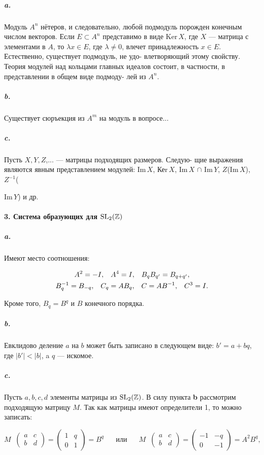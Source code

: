 \subparagraph{a.} Модуль $A^{n}$ нётеров, и следовательно, любой подмодуль порожден
конечным числом векторов. Если $E \subset A^{n}$ представимо в виде Ker\,{$X$},
где $X$ --- матрица с элементами в $A$, то $\lambda{x} \in E$, где $\lambda \neq 0$, влечет
принадлежность $x \in E$. Естественно, существует подмодуль, не удо-
влетворяющий этому свойству. Теория модулей над кольцами главных
идеалов состоит, в частности, в представлении в общем виде подмоду-
лей из $A^{n}$.

\subparagraph{b.} Существует сюръекция из $A^{m}$ на модуль в вопросе...

\subparagraph{c.} Пусть $X, Y, Z$,... --- матрицы подходящих размеров. Следую-
щие выражения являются явным представлением модулей: Im\,{$X$}, Кеr\,{$X$},
Im\,{$X$} $\cap$ Im\,{$Y$}, $Z$(Im\,{$X$}), $Z^{-1}$({Im\,{$Y$}) и др.

\paragraph{3. Система образующих для $\rm{SL_{2}}(\mathbb {Z})$}

\subparagraph{\bf a.} Имеют место соотношения:

\begin{gather*}
A^{2} = -I,\;\;\;A^{4} = I,\;\;\;B_{q}B_{q'} = B_{q+q'}, \\
B^{-1}_{q} = B_{-q},\;\;\;C_{q} = AB_{q},\;\;\;C = AB^{-1},\;\;\;C^{3} = I.  \notag
\end{gather*}

\noindent Кроме того, $B_{q} = B^{q}$ и $B$ конечного порядка.

\subparagraph{b.} Евклидово деление $a$ на $b$ может быть записано в следующем виде:
$b' = a + bq$, где $|b'| < |b|$, a $q$ --- искомое.


\restoretop
{}

\subparagraph{c.} Пусть $a, b, c, d$ элементы матрицы из $\rm{SL_{2}}(\mathbb {Z})$. В силу пункта {\bf b} рассмотрим подходящую матрицу $M$. Так как матрицы имеют определители 1, то можно записать:

\begin{equation*}
M\;\;{\begin{pmatrix} a & c \\ b & d \end{pmatrix}} = \begin{pmatrix} 1 & q \\ 0 & 1 \end{pmatrix} = B^{q}\;\;\;\;\;\;\text{или}\;\;\;\;\;\;M\;\;{\begin{pmatrix} a & c \\ b & d \end{pmatrix}} = \begin{pmatrix} -1 & -q \\ 0 & -1 \end{pmatrix} = A^{2}B^{q},
\end{equation*}

}

